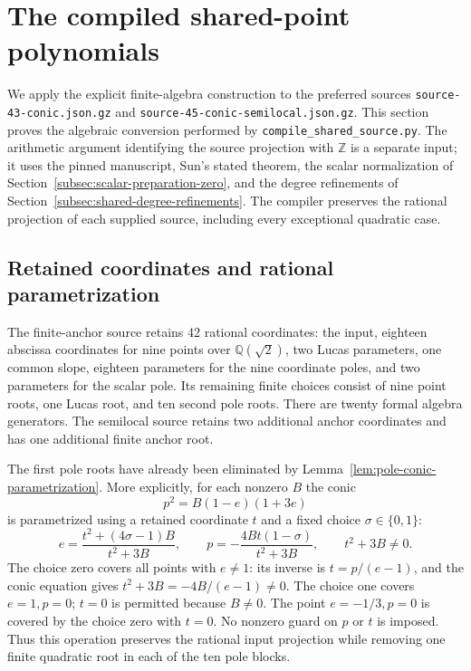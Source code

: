 \section{The compiled shared-point polynomials}
\label{sec:compiled-shared-polynomials}

We apply the explicit finite-algebra construction to the preferred
sources \texttt{source-43-conic.json.gz} and
\texttt{source-45-conic-semilocal.json.gz}.  This section proves the
algebraic conversion performed by \texttt{compile\_shared\_source.py}.
The arithmetic argument identifying the source projection with
$\mathbb Z$ is a separate input; it uses the pinned manuscript,
Sun's stated theorem, the scalar normalization of
Section~\ref{subsec:scalar-preparation-zero}, and the degree
refinements of Section~\ref{subsec:shared-degree-refinements}.
The compiler preserves the rational projection of each supplied
source, including every exceptional quadratic case.

\subsection{Retained coordinates and rational parametrization}

The finite-anchor source retains 42 rational coordinates: the
input, eighteen abscissa coordinates for nine points over
$\mathbb Q(\sqrt2)$, two Lucas parameters, one common slope,
eighteen parameters for the nine coordinate poles, and two
parameters for the scalar pole.  Its remaining finite choices
consist of nine point roots, one Lucas root, and ten second
pole roots.  There are twenty formal algebra generators.
The semilocal source retains two additional anchor coordinates
and has one additional finite anchor root.

The first pole roots have already been eliminated by
Lemma~\ref{lem:pole-conic-parametrization}.  More explicitly,
for each nonzero $B$ the conic
\[
                     p^2=B(1-e)(1+3e)
\]
is parametrized using a retained coordinate $t$ and a fixed
choice $\sigma\in\{0,1\}$:
\[
 e=\frac{t^2+(4\sigma-1)B}{t^2+3B},\qquad
 p=-\frac{4Bt(1-\sigma)}{t^2+3B},\qquad t^2+3B\ne0.
\]
The choice zero covers all points with $e\ne1$: its inverse is
$t=p/(e-1)$, and the conic equation gives
$t^2+3B=-4B/(e-1)\ne0$.  The choice one covers $e=1,p=0$;
$t=0$ is permitted because $B\ne0$.  The point $e=-1/3,p=0$
is covered by the choice zero with $t=0$.  No nonzero guard on
$p$ or $t$ is imposed.  Thus this operation preserves the rational
input projection while removing one finite quadratic root in
each of the ten pole blocks.

